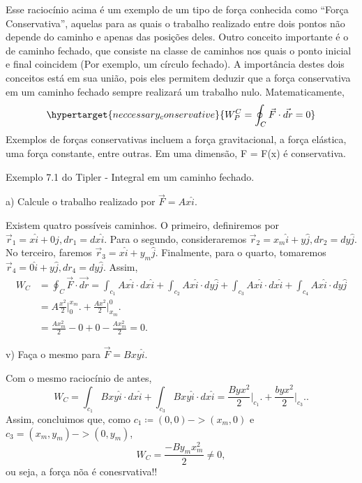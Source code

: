 \documentclass[PhysicsI/physics_notes.tex]{subfiles}
\begin{document}
Esse raciocínio acima é um exemplo de um tipo de força conhecida como ``Força Conservativa'', aquelas para as quais o trabalho realizado entre dois pontos
não depende do caminho e apenas das posições deles.  Outro conceito importante é o de caminho fechado, que consiste na classe de caminhos nos quais o ponto inicial
e final coincidem (Por exemplo, um círculo fechado). A importância destes dois conceitos está em sua união, pois eles permitem deduzir que a força conservativa em
um caminho fechado sempre realizará um trabalho nulo. Matematicamente,
\[
	\hypertarget{neccessary_conservative}{W_{P}^{C} = \oint_{C}\vec{F}\cdot \vec{dr} = 0}
\]
Exemplos de forças conservativas incluem a força gravitacional, a força elástica, uma força constante, entre outras.
Em uma dimensão, F = F(x) é conservativa.
\begin{example}
	Exemplo 7.1 do Tipler - Integral em um caminho fechado.

	a) Calcule o trabalho realizado por \(\vec{F} = Ax \hat{i}\).

	Existem quatro possíveis caminhos. O primeiro, definiremos por \(\vec{r}_{1} = x\hat{i} + 0\hat{j}, dr_{1} = dx\hat{i}\). Para o segundo, consideraremos
	\(\vec{r}_{2} = x_{m}\hat{i} + y\hat{j}, dr_{2} = dy\hat{j}.\) No terceiro, faremos \(\vec{r}_{3} = x\hat{i} + y_{m}\hat{j}\). Finalmente, para o quarto,
	tomaremos \(\vec{r}_{4} = 0\hat{i} + y\hat{j}, dr_{4} = dy\hat{j}.\) Assim,
	\begin{align*}
		W_{C} & = \oint_{C}\vec{F}\cdot \vec{dr} = \int_{c_{1}}^{}Ax\hat{i}\cdot dx\hat{i} + \int_{c_{2}}^{}Ax\hat{i}\cdot dy\hat{j} + \int_{c_{3}}^{}Ax\hat{i}\cdot dx\hat{i}+ \int_{c_{4}}^{}Ax\hat{i}\cdot dy\hat{j} \\
		      & = A \frac{x^{2}}{2}\biggl|_{0}^{x_{m}}\biggr. + \frac{Ax^{2}}{2}\biggl|_{x_{m}}^{0}\biggr.                                                                                                              \\
		      & = \frac{Ax_{m}^{2}}{2} - 0 + 0 - \frac{Ax_{m}^{2}}{2} = 0.
	\end{align*}

	v) Faça o mesmo para \(\vec{F} = Bxy\hat{i}\).

	Com o mesmo raciocínio de antes,
	\[
		W_{C} = \int_{c_{1}}^{}Bxy\hat{i}\cdot dx\hat{i} + \int_{c_{3}}^{}Bxy\hat{i}\cdot dx\hat{i} = \frac{Byx^{2}}{2}\biggl|_{c_{1}}^{}\biggr. + \frac{byx^{2}}{2}\biggl|_{c_{3}}^{}\biggr. .
	\]
	Assim, concluimos que, como \(c_{1} \coloneqq (0, 0)->(x_{m}, 0)\) e \(c_{3} = (x_{m}, y_{m})->(0, y_{m})\),
	\[
		W_{C} = \frac{-By_{m}x_{m}^{2}}{2}\neq0,
	\]
	ou seja, a força nõa é conesrvativa!!
\end{example}
\end{document}
